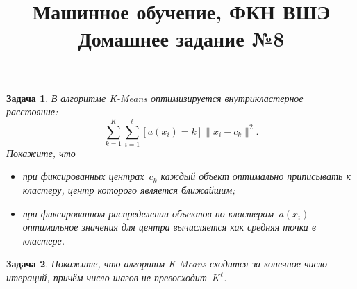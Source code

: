 \documentclass[12pt,fleqn]{article}
\title{Машинное обучение, ФКН ВШЭ\\Домашнее задание №8}
\author{}
\date{}
\newtheorem{esProblem}{Задача}
\begin{document}
\maketitle

\begin{esProblem}
    В алгоритме K-Means оптимизируется внутрикластерное расстояние:
    \[
        \sum_{k = 1}^{K} \sum_{i = 1}^{\ell}
            [a(x_i) = k]
            \| x_i - c_k \|^2.
    \]
    Покажите, что
    \begin{itemize}
        \item при фиксированных центрах~$c_k$ каждый объект оптимально приписывать к кластеру,
            центр которого является ближайшим;
        \item при фиксированном распределении объектов по кластерам~$a(x_i)$
            оптимальное значения для центра вычисляется как средняя точка в кластере.
    \end{itemize}
\end{esProblem}

\begin{esProblem}
    Покажите, что алгоритм K-Means сходится за конечное число итераций,
    причём число шагов не превосходит~$K^\ell$.
\end{esProblem}
\end{document}
